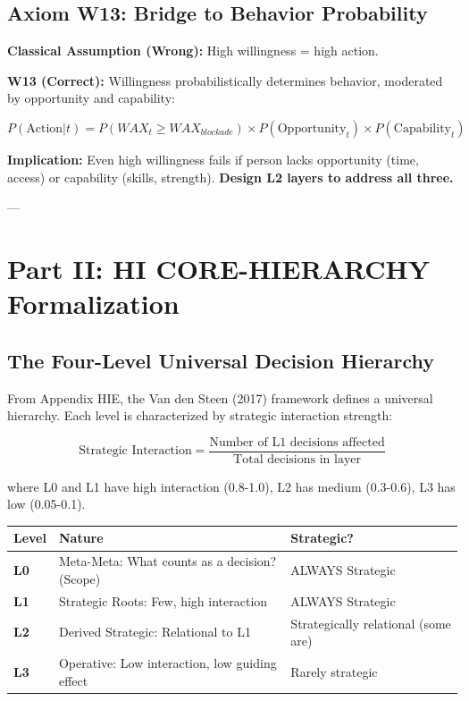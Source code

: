 \documentclass[11pt, a4paper]{article}
\begin{document}
\subsection{Axiom W13: Bridge to Behavior Probability} \label{sec:ch15-part1c}

\textbf{Classical Assumption (Wrong):} High willingness = high action.

\textbf{W13 (Correct):} Willingness probabilistically determines behavior, moderated by opportunity and capability:

$$P(\text{Action} | t) = P(WAX_t \geq WAX_{blockade}) \times P(\text{Opportunity}_t) \times P(\text{Capability}_t)$$

\textbf{Implication:} Even high willingness fails if person lacks opportunity (time, access) or capability (skills, strength). \textbf{Design L2 layers to address all three.}

---

\section{Part II: HI CORE-HIERARCHY Formalization}\label{sec:ch15-part2a}

\subsection{The Four-Level Universal Decision Hierarchy} \label{sec:ch15-part2a}

From Appendix HIE, the Van den Steen (2017) framework defines a universal hierarchy. Each level is characterized by strategic interaction strength:

\begin{equation}
\text{Strategic Interaction} = \frac{\text{Number of L1 decisions affected}}{\text{Total decisions in layer}}
\end{equation}

where L0 and L1 have high interaction (0.8-1.0), L2 has medium (0.3-0.6), L3 has low (0.05-0.1).

\begin{center}
\begin{tabular}{|l|p{5cm}|l|}
\hline
\textbf{Level} & \textbf{Nature} & \textbf{Strategic?} \\
\hline
\textbf{L0} & Meta-Meta: What counts as a decision? (Scope) & ALWAYS Strategic \\
\hline
\textbf{L1} & Strategic Roots: Few, high interaction & ALWAYS Strategic \\
\hline
\textbf{L2} & Derived Strategic: Relational to L1 & Strategically relational (some are) \\
\hline
\textbf{L3} & Operative: Low interaction, low guiding effect & Rarely strategic \\
\hline
\end{tabular}
\end{center}
\end{document}
